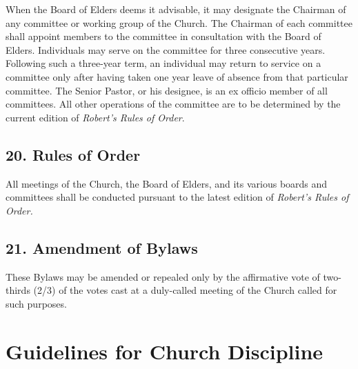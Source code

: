 \documentclass[
]{book}
\begin{document}
When the Board of Elders deems it advisable, it may designate the Chairman of any committee or working group of the Church. The Chairman of each committee shall appoint members to the committee in consultation with the Board of Elders. Individuals may serve on the committee for three consecutive years. Following such a three-year term, an individual may return to service on a committee only after having taken one year leave of absence from that particular committee. The Senior Pastor, or his designee, is an ex officio member of all committees. All other operations of the committee are to be determined by the current edition of \emph{Robert's Rules of Order}.

\hypertarget{rules-of-order}{%
\section*{20. Rules of Order}\label{rules-of-order}}

All meetings of the Church, the Board of Elders, and its various boards and committees shall be conducted pursuant to the latest edition of \emph{Robert's Rules of Order.}

\hypertarget{amendment-of-bylaws}{%
\section*{21. Amendment of Bylaws}\label{amendment-of-bylaws}}

These Bylaws may be amended or repealed only by the affirmative vote of two-thirds (2/3) of the votes cast at a duly-called meeting of the Church called for such purposes.

\hypertarget{guidelines-for-church-discipline}{%
\chapter{Guidelines for Church Discipline}\label{guidelines-for-church-discipline}}
\end{document}
